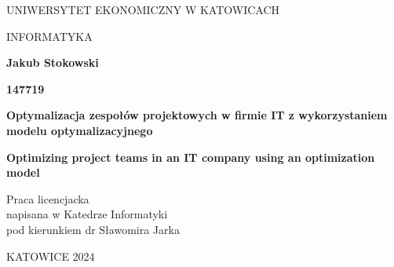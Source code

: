 
\pagestyle{empty}
\noindent
\begin{center}
    UNIWERSYTET EKONOMICZNY W KATOWICACH
\end{center}

\begin{center}
    INFORMATYKA
\end{center}

\vfill
\begin{center}
    \textbf{Jakub Stokowski}
    \par \normalsize \textbf{147719}
\end{center}
\vfill

\begin{center}
    \Large
	\textbf{Optymalizacja zespołów projektowych w firmie IT z wykorzystaniem modelu optymalizacyjnego}
\end{center}

\begin{center}
	\textbf{Optimizing project teams in an IT company using an optimization model}
\end{center}

\vfill
\vfill
\vfill

\begin{flushright}
Praca licencjacka \\
napisana w Katedrze Informatyki \\ 
pod kierunkiem dr Sławomira Jarka
\end{flushright}

\vfill
\begin{center}
    KATOWICE 2024
\end{center}

\newpage 
\pagestyle{fancy}
\fancyhf{}
\fancyhf{} %
\renewcommand{\headrulewidth}{0pt}
\fancyfoot[R]{\thepage}
\newpage
\tableofcontents


